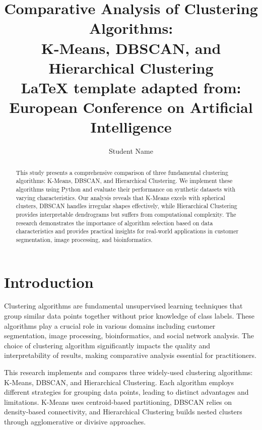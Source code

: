 \documentclass{COMPXXXX}
\begin{document}
\title{Comparative Analysis of Clustering Algorithms:\\
	K-Means, DBSCAN, and Hierarchical Clustering \\
	\small \LaTeX \hspace{1mm} template adapted from: \\
	European Conference on Artificial Intelligence}

\author{Student Name}

\maketitle


\begin{abstract}
This study presents a comprehensive comparison of three fundamental clustering algorithms: K-Means, DBSCAN, and Hierarchical Clustering. We implement these algorithms using Python and evaluate their performance on synthetic datasets with varying characteristics. Our analysis reveals that K-Means excels with spherical clusters, DBSCAN handles irregular shapes effectively, while Hierarchical Clustering provides interpretable dendrograms but suffers from computational complexity. The research demonstrates the importance of algorithm selection based on data characteristics and provides practical insights for real-world applications in customer segmentation, image processing, and bioinformatics.
\end{abstract}


\section{Introduction}

Clustering algorithms are fundamental unsupervised learning techniques that group similar data points together without prior knowledge of class labels. These algorithms play a crucial role in various domains including customer segmentation, image processing, bioinformatics, and social network analysis. The choice of clustering algorithm significantly impacts the quality and interpretability of results, making comparative analysis essential for practitioners.

This research implements and compares three widely-used clustering algorithms: K-Means, DBSCAN, and Hierarchical Clustering. Each algorithm employs different strategies for grouping data points, leading to distinct advantages and limitations. K-Means uses centroid-based partitioning, DBSCAN relies on density-based connectivity, and Hierarchical Clustering builds nested clusters through agglomerative or divisive approaches.
\end{document}
